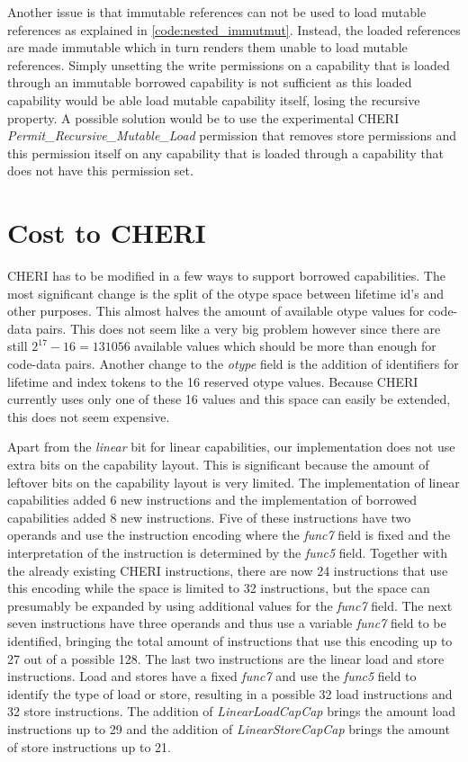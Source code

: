 Another issue is that immutable references can not be used to load mutable references as explained in \ref{code:nested_immutmut}.
Instead, the loaded references are made immutable which in turn renders them unable to load mutable references.
Simply unsetting the write permissions on a capability that is loaded through an immutable borrowed capability is not sufficient as this loaded capability would be able load mutable capability itself, losing the recursive property.
A possible solution would be to use the experimental CHERI \textit{Permit\_Recursive\_Mutable\_Load} permission \cite{UCAM-CL-TR-951} that removes store permissions and this permission itself on any capability that is loaded through a capability that does not have this permission set.

\section{Cost to CHERI}
\label{sec:chericost}
CHERI has to be modified in a few ways to support borrowed capabilities.
The most significant change is the split of the otype space between lifetime id's and other purposes.
This almost halves the amount of available otype values for code-data pairs.
This does not seem like a very big problem however since there are still $2^{17} - 16 = 131056$ available values which should be more than enough for code-data pairs.
Another change to the \textit{otype} field is the addition of identifiers for lifetime and index tokens to the 16 reserved otype values.
Because CHERI currently uses only one of these 16 values and this space can easily be extended, this does not seem expensive.

Apart from the \textit{linear} bit for linear capabilities, our implementation does not use extra bits on the capability layout.
This is significant because the amount of leftover bits on the capability layout is very limited.
The implementation of linear capabilities added 6 new instructions and the implementation of borrowed capabilities added 8 new instructions.
Five of these instructions have two operands and use the instruction encoding where the \textit{func7} field is fixed and the interpretation of the instruction is determined by the \textit{func5} field.
Together with the already existing CHERI instructions, there are now 24 instructions that use this encoding while the space is limited to 32 instructions, but the space can presumably be expanded by using additional values for the \textit{func7} field.
The next seven instructions have three operands and thus use a variable \textit{func7} field to be identified, bringing the total amount of instructions that use this encoding up to 27 out of a possible 128.
The last two instructions are the linear load and store instructions. Load and stores have a fixed \textit{func7} and use the \textit{func5} field to identify the type of load or store, resulting in a possible 32 load instructions and 32 store instructions.
The addition of \textit{LinearLoadCapCap} brings the amount load instructions up to 29 and the addition of \textit{LinearStoreCapCap} brings the amount of store instructions up to 21.

